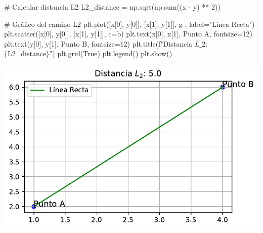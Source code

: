 \documentclass[
  letterpaper,
  DIV=11,
  numbers=noendperiod]{scrartcl}
\newenvironment{Shaded}{\begin{snugshade}}{\end{snugshade}}
\newcommand{\BuiltInTok}[1]{\textcolor[rgb]{0.00,0.23,0.31}{#1}}
\newcommand{\CommentTok}[1]{\textcolor[rgb]{0.37,0.37,0.37}{#1}}
\newcommand{\DecValTok}[1]{\textcolor[rgb]{0.68,0.00,0.00}{#1}}
\newcommand{\NormalTok}[1]{\textcolor[rgb]{0.00,0.23,0.31}{#1}}
\newcommand{\OperatorTok}[1]{\textcolor[rgb]{0.37,0.37,0.37}{#1}}
\newcommand{\SpecialCharTok}[1]{\textcolor[rgb]{0.37,0.37,0.37}{#1}}
\newcommand{\SpecialStringTok}[1]{\textcolor[rgb]{0.13,0.47,0.30}{#1}}
\newcommand{\StringTok}[1]{\textcolor[rgb]{0.13,0.47,0.30}{#1}}
\newcommand{\VariableTok}[1]{\textcolor[rgb]{0.07,0.07,0.07}{#1}}
\begin{document}
\begin{Shaded}
\begin{Highlighting}[]
\CommentTok{\# Calcular distancia L2}
\NormalTok{L2\_distance }\OperatorTok{=}\NormalTok{ np.sqrt(np.}\BuiltInTok{sum}\NormalTok{((x }\OperatorTok{{-}}\NormalTok{ y) }\OperatorTok{**} \DecValTok{2}\NormalTok{))}

\CommentTok{\# Gráfico del camino L2}
\NormalTok{plt.plot([x[}\DecValTok{0}\NormalTok{], y[}\DecValTok{0}\NormalTok{]], [x[}\DecValTok{1}\NormalTok{], y[}\DecValTok{1}\NormalTok{]], }\StringTok{\textquotesingle{}g{-}\textquotesingle{}}\NormalTok{, label}\OperatorTok{=}\StringTok{"Línea Recta"}\NormalTok{)}
\NormalTok{plt.scatter([x[}\DecValTok{0}\NormalTok{], y[}\DecValTok{0}\NormalTok{]], [x[}\DecValTok{1}\NormalTok{], y[}\DecValTok{1}\NormalTok{]], c}\OperatorTok{=}\StringTok{\textquotesingle{}b\textquotesingle{}}\NormalTok{)}
\NormalTok{plt.text(x[}\DecValTok{0}\NormalTok{], x[}\DecValTok{1}\NormalTok{], }\StringTok{\textquotesingle{}Punto A\textquotesingle{}}\NormalTok{, fontsize}\OperatorTok{=}\DecValTok{12}\NormalTok{)}
\NormalTok{plt.text(y[}\DecValTok{0}\NormalTok{], y[}\DecValTok{1}\NormalTok{], }\StringTok{\textquotesingle{}Punto B\textquotesingle{}}\NormalTok{, fontsize}\OperatorTok{=}\DecValTok{12}\NormalTok{)}
\NormalTok{plt.title(}\SpecialStringTok{f"Distancia $L\_2$: }\SpecialCharTok{\{}\NormalTok{L2\_distance}\SpecialCharTok{\}}\SpecialStringTok{"}\NormalTok{)}
\NormalTok{plt.grid(}\VariableTok{True}\NormalTok{)}
\NormalTok{plt.legend()}
\NormalTok{plt.show()}
\end{Highlighting}
\end{Shaded}

\includegraphics{presentacion_files/figure-pdf/cell-7-output-1.pdf}
\end{document}
